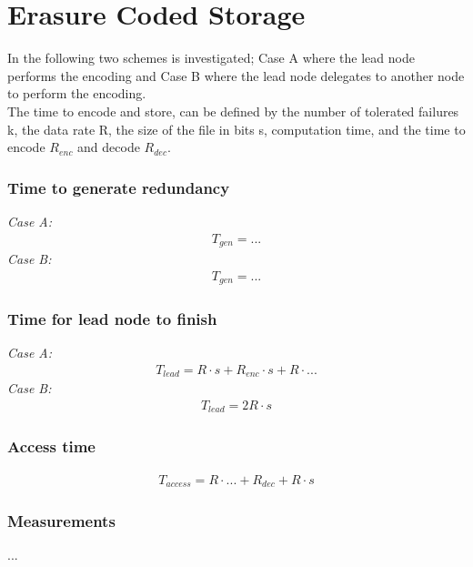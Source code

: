 \section{Erasure Coded Storage}
In the following two schemes is investigated; Case A where the lead node performs the encoding and Case B where the lead node delegates to another node to perform the encoding.\\
The time to encode and store, can be defined by the number of tolerated failures k, the data rate R, the size of the file in bits s, computation time, and the time to encode $R_{enc}$ and decode $R_{dec}$.

\subsubsection*{Time to generate redundancy}
\textit{Case A:} 
\begin{align}
    T_{gen} = ...
\end{align}
\textit{Case B:} 
\begin{align}
    T_{gen} = ...
\end{align}

\subsubsection*{Time for lead node to finish}
\textit{Case A:} 
\begin{align}
    T_{lead} = R \cdot s + R_{enc} \cdot s + R \cdot ...
\end{align}
\textit{Case B:} 
\begin{align}
    T_{lead} = 2R \cdot s
\end{align}

\subsubsection*{Access time}
\begin{align}
    T_{access} = R \cdot ... + R_{dec} + R \cdot s
\end{align}

\subsubsection*{Measurements}
...